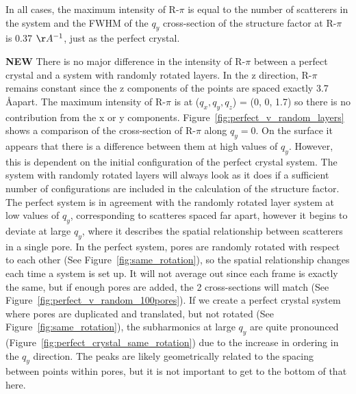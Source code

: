 \documentclass{article}
\begin{document}
  In all cases, the maximum intensity of R-$\pi$ is equal to the number of
  scatterers in the system and the FWHM of the $q_y$ cross-section of the
  structure factor at R-$\pi$ is 0.37 $\AA^{-1}$, just as the perfect crystal.

  \textbf{NEW} There is no major difference in the intensity of R-$\pi$ between
  a perfect crystal and a system with randomly rotated layers. In the z
  direction, R-$\pi$ remains constant since the z components of the points are
  spaced exactly 3.7 \AA apart. The maximum intensity of R-$\pi$ is at ($q_x,
  q_y, q_z$) = (0, 0, 1.7) so there is no contribution from the x or y
  components. Figure~\ref{fig:perfect_v_random_layers} shows a comparison of the
  cross-section of R-$\pi$ along $q_y=0$. On the surface it appears that there is
  a difference between them at high values of $q_y$. However, this is dependent
  on the initial configuration of the perfect crystal system. The system with
  randomly rotated layers will always look as it does if a sufficient number of
  configurations are included in the calculation of the structure factor. The
  perfect system is in agreement with the randomly rotated layer system at low
  values of $q_y$, corresponding to scatteres spaced far apart, however it begins
  to deviate at large $q_y$, where it describes the spatial relationship between
  scatterers in a single pore. In the perfect system, pores are randomly rotated
  with respect to each other (See Figure~\ref{fig:same_rotation}), so the spatial
  relationship changes each time a system is set up. It will not average out since
  each frame is exactly the same, but if enough pores are added, the 2 
  cross-sections will match (See Figure~\ref{fig:perfect_v_random_100pores}). 
  If we create a perfect crystal system where pores are duplicated and translated, but
  not rotated (See Figure~\ref{fig:same_rotation}), the subharmonics
  at large $q_y$ are quite pronounced (Figure~\ref{fig:perfect_crystal_same_rotation})
  due to the increase in ordering in the $q_y$ direction. The peaks are likely
  geometrically related to the spacing between points within pores, but it is 
  not important to get to the bottom of that here.  
\end{document}
